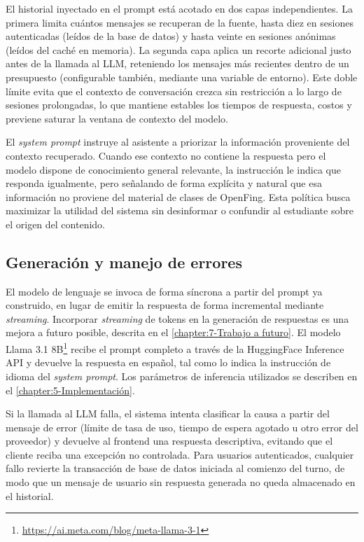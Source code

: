 El historial inyectado en el prompt está acotado en dos capas independientes. La primera limita cuántos mensajes se recuperan de la fuente, hasta diez en sesiones autenticadas (leídos de la base de datos) y hasta veinte en sesiones anónimas (leídos del caché en memoria). La segunda capa aplica un recorte adicional justo antes de la llamada al LLM, reteniendo los mensajes más recientes dentro de un presupuesto (configurable también, mediante una variable de entorno). Este doble límite evita que el contexto de conversación crezca sin restricción a lo largo de sesiones prolongadas, lo que mantiene estables los tiempos de respuesta, costos y previene saturar la ventana de contexto del modelo.

El \textit{system prompt} instruye al asistente a priorizar la información proveniente del contexto recuperado. Cuando ese contexto no contiene la respuesta pero el modelo dispone de conocimiento general relevante, la instrucción le indica que responda igualmente, pero señalando de forma explícita y natural que esa información no proviene del material de clases de OpenFing. Esta política busca maximizar la utilidad del sistema sin desinformar o confundir al estudiante sobre el origen del contenido.

\subsection{Generación y manejo de errores}
\label{subsection:4-Generacion}

El modelo de lenguaje se invoca de forma síncrona a partir del prompt ya construido, en lugar de emitir la respuesta de forma incremental mediante \textit{streaming}. Incorporar \textit{streaming} de tokens en la generación de respuestas es una mejora a futuro posible, descrita en el \autoref{chapter:7-Trabajo a futuro}. El modelo Llama 3.1 8B\footnote{\url{https://ai.meta.com/blog/meta-llama-3-1}} recibe el prompt completo a través de la HuggingFace Inference API y devuelve la respuesta en español, tal como lo indica la instrucción de idioma del \textit{system prompt}. Los parámetros de inferencia utilizados se describen en el \autoref{chapter:5-Implementación}.

Si la llamada al LLM falla, el sistema intenta clasificar la causa a partir del mensaje de error (límite de tasa de uso, tiempo de espera agotado u otro error del proveedor) y devuelve al frontend una respuesta descriptiva, evitando que el cliente reciba una excepción no controlada. Para usuarios autenticados, cualquier fallo revierte la transacción de base de datos iniciada al comienzo del turno, de modo que un mensaje de usuario sin respuesta generada no queda almacenado en el historial.

